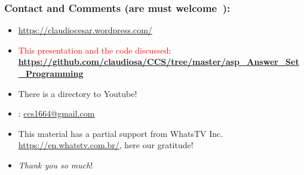 \documentclass{beamer}
\begin{document}
\begin{frame}
\frametitle{Contact and Comments (are must welcome\ \Smiley):}
  
\begin{block}{}
  \begin{itemize}
  \item \url{https://claudiocesar.wordpress.com/}
   \item \textcolor{red}{This presentation and the code discussed}:\\
   \textbf{\textcolor{blue}{\url{https://github.com/claudiosa/CCS/tree/master/asp_Answer_Set_Programming}}}
   \item There is a directory to Youtube!
    
  \item \Letter: \url{ccs1664@gmail.com}
  \item This material has a partial support from WhatsTV Inc. \url{https://en.whatstv.com.br/}, here our gratitude!
  \item \textit{Thank you so much}!

  \end{itemize}
  \end{block}

\end{frame}


\end{document}
